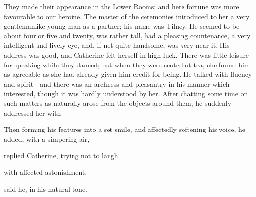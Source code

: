 They made their appearance in the Lower Rooms; and here fortune was more favourable to our heroine. The master of the ceremonies introduced to her a very gentlemanlike young man as a partner; his name was Tilney. He seemed to be about four or five and twenty, was rather tall, had a pleasing countenance, a very intelligent and lively eye, and, if not quite handsome, was very near it. His address was good, and Catherine felt herself in high luck. There was little leisure for speaking while they danced; but when they were seated at tea, she found him as agreeable as she had already given him credit for being. He talked with fluency and spirit---and there was an archness and pleasantry in his manner which interested, though it was hardly understood by her. After chatting some time on such matters as naturally arose from the objects around them, he suddenly addressed her with---


 Then forming his features into a set smile, and affectedly softening his voice, he added, with a simpering air, 

 replied Catherine, trying not to laugh.

 with affected astonishment.


 said he, in his natural tone. 





